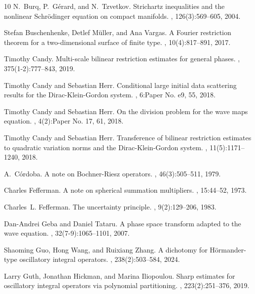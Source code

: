 \documentclass{amsart}
\theoremstyle{definition}
\begin{document}
\begin{thebibliography}{10}
N.~Burq, P.~G\'erard, and N.~Tzvetkov.
\newblock Strichartz inequalities and the nonlinear {S}chr\"odinger equation on
  compact manifolds.
, 126(3):569--605, 2004.

Stefan Buschenhenke, Detlef M\"uller, and Ana Vargas.
\newblock A {F}ourier restriction theorem for a two-dimensional surface of
  finite type.
, 10(4):817--891, 2017.

Timothy Candy.
\newblock Multi-scale bilinear restriction estimates for general phases.
, 375(1-2):777--843, 2019.

Timothy Candy and Sebastian Herr.
\newblock Conditional large initial data scattering results for the
  {D}irac-{K}lein-{G}ordon system.
, 6:Paper No. e9, 55, 2018.

Timothy Candy and Sebastian Herr.
\newblock On the division problem for the wave maps equation.
, 4(2):Paper No. 17, 61, 2018.

Timothy Candy and Sebastian Herr.
\newblock Transference of bilinear restriction estimates to quadratic variation
  norms and the {D}irac-{K}lein-{G}ordon system.
, 11(5):1171--1240, 2018.

A.~C\'ordoba.
\newblock A note on {B}ochner-{R}iesz operators.
, 46(3):505--511, 1979.

Charles Fefferman.
\newblock A note on spherical summation multipliers.
, 15:44--52, 1973.

Charles~L. Fefferman.
\newblock The uncertainty principle.
, 9(2):129--206, 1983.

Dan-Andrei Geba and Daniel Tataru.
\newblock A phase space transform adapted to the wave equation.
, 32(7-9):1065--1101, 2007.

Shaoming Guo, Hong Wang, and Ruixiang Zhang.
\newblock A dichotomy for {H}\"ormander-type oscillatory integral operators.
, 238(2):503--584, 2024.

Larry Guth, Jonathan Hickman, and Marina Iliopoulou.
\newblock Sharp estimates for oscillatory integral operators via polynomial
  partitioning.
, 223(2):251--376, 2019.


\end{thebibliography}
\end{document}
